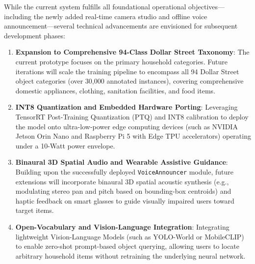 While the current system fulfills all foundational operational objectives---including the newly added real-time camera studio and offline voice announcement---several technical advancements are envisioned for subsequent development phases:

\begin{enumerate}
    \item \textbf{Expansion to Comprehensive 94-Class Dollar Street Taxonomy}: The current prototype focuses on the primary household categories. Future iterations will scale the training pipeline to encompass all 94 Dollar Street object categories (over 30,000 annotated instances), covering comprehensive domestic appliances, clothing, sanitation facilities, and food items.
    \item \textbf{INT8 Quantization and Embedded Hardware Porting}: Leveraging TensorRT Post-Training Quantization (PTQ) and INT8 calibration to deploy the model onto ultra-low-power edge computing devices (such as NVIDIA Jetson Orin Nano and Raspberry Pi 5 with Edge TPU accelerators) operating under a 10-Watt power envelope.
    \item \textbf{Binaural 3D Spatial Audio and Wearable Assistive Guidance}: Building upon the successfully deployed \texttt{VoiceAnnouncer} module, future extensions will incorporate binaural 3D spatial acoustic synthesis (e.g., modulating stereo pan and pitch based on bounding-box centroids) and haptic feedback on smart glasses to guide visually impaired users toward target items.
    \item \textbf{Open-Vocabulary and Vision-Language Integration}: Integrating lightweight Vision-Language Models (such as YOLO-World or MobileCLIP) to enable zero-shot prompt-based object querying, allowing users to locate arbitrary household items without retraining the underlying neural network.
\end{enumerate}
